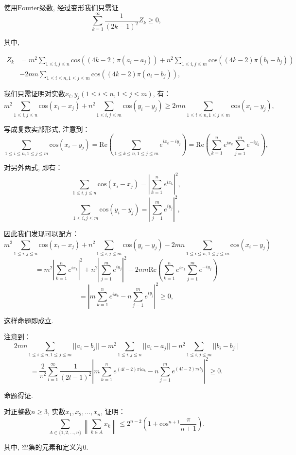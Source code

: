 \documentclass[lang=cn,12pt,thmcnt=section]{elegantbook}
\begin{document}
\begin{analysis}
使用$\mathrm{Fourier}$级数, 经过变形我们只需证
\[
\sum_{k=1}^\infty \frac{1}{(2k-1)^2}Z_k\ge 0,
\]

其中, 

\begin{align*}
Z_k&=m^2\sum_{1\le i,j\le n}\mathrm{cos}((4k-2)\pi (a_i-a_j))+n^2\sum_{1\le i,j\le m}\mathrm{cos}((4k-2)\pi (b_i-b_j))\\
&-2mn\sum_{1\le i\le n,1\le j\le m}\mathrm{cos}((4k-2)\pi (a_i-b_j)),
\end{align*}
 

我们只需证明对实数$x_i,y_j(1\le i\le n,1\le j\le m)$, 有：
\[
m^2\sum_{1\le i,j\le n}\mathrm{cos}(x_i-x_j)+n^2\sum_{1\le i,j\le m}\mathrm{cos}(y_i-y_j)\ge 2mn\sum_{1\le i\le n,1\le j\le m}\mathrm{cos}(x_i-y_j),
\]

写成复数实部形式, 注意到：
\[
\sum_{1\le i\le n,1\le j\le m}\mathrm{cos}(x_i-y_j)=\mathrm{Re}\left(\sum_{1\le k\le n,1\le j\le m}e^{ix_k-iy_j}\right)=\mathrm{Re}\left(\sum_{k=1}^ne^{ix_k}\sum_{j=1}^me^{-iy_k}\right),
\]

对另外两式, 即有：
\[
\sum_{1\le i,j\le n}\mathrm{cos}(x_i-x_j)=\left|\sum_{k=1}^ne^{ix_k}\right|^2,
\]
\[
\sum_{1\le i,j\le m}\mathrm{cos}(y_i-y_j)=\left|\sum_{j=1}^me^{iy_j}\right|^2,
\]

因此我们发现可以配方：
\[
m^2\sum_{1\le i,j\le n}\mathrm{cos}(x_i-x_j)+n^2\sum_{1\le i,j\le m}\mathrm{cos}(y_i-y_j)- 2mn\sum_{1\le i\le n,1\le j\le m}\mathrm{cos}(x_i-y_j)
\]
\[
=m^2\left|\sum_{k=1}^ne^{ix_k}\right|^2+n^2\left|\sum_{j=1}^me^{iy_j}\right|^2-2mn\mathrm{Re}\left(\sum_{k=1}^ne^{ix_k}\sum_{j=1}^me^{-iy_j}\right)
\]
\[
=\left|m\sum_{k=1}^ne^{ix_k}-n\sum_{j=1}^me^{iy_j}\right|^2\ge 0,
\]

这样命题即成立.
\end{analysis}

\begin{solution}
注意到：
\[
2mn\sum_{1\le i\le n,1\le j\le m}||a_i-b_j||-m^2\sum_{1\le i,j\le n}||a_i-a_j||-n^2\sum_{1\le i,j\le m}||b_i-b_j||
\]
\[
=\frac{2}{\pi^2}\sum_{l=1}^\infty \frac{1}{(2l-1)^2}\left|m\sum_{k=1}^ne^{(4l-2)\pi ia_k}-n\sum_{j=1}^me^{(4l-2)\pi ib_j}\right|^2\ge 0.
\]

命题得证.
\end{solution}

\begin{example}
对正整数$n\ge 3$, 实数$x_1,x_2,\dots{},x_n$, 证明：
\[
\sum_{ A\in\{1,2,\dots{},n\}}\left\lVert\sum_{k\in A}x_k\right\rVert\le 2^{n-2}\left(1+\mathrm{cos}^{n+1}\frac{\pi}{n+1}\right).
\]

其中, 空集的元素和定义为$0$.
\end{example}
\end{document}
